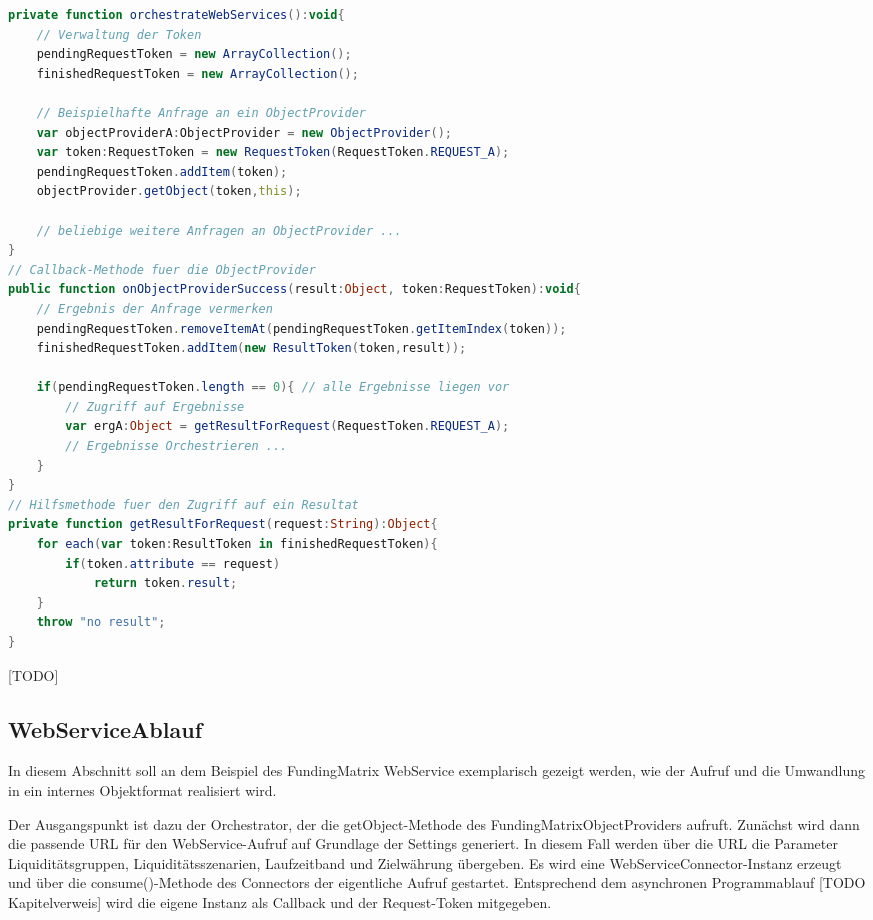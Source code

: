 \begin{programm}[h] %
\begin{lstlisting}[language=ActionScript]
private function orchestrateWebServices():void{
	// Verwaltung der Token
	pendingRequestToken = new ArrayCollection();
	finishedRequestToken = new ArrayCollection();
	
	// Beispielhafte Anfrage an ein ObjectProvider
	var objectProviderA:ObjectProvider = new ObjectProvider();
	var token:RequestToken = new RequestToken(RequestToken.REQUEST_A);
	pendingRequestToken.addItem(token);
	objectProvider.getObject(token,this);
	
	// beliebige weitere Anfragen an ObjectProvider ...
}
// Callback-Methode fuer die ObjectProvider
public function onObjectProviderSuccess(result:Object, token:RequestToken):void{
	// Ergebnis der Anfrage vermerken
	pendingRequestToken.removeItemAt(pendingRequestToken.getItemIndex(token));
	finishedRequestToken.addItem(new ResultToken(token,result));
	
	if(pendingRequestToken.length == 0){ // alle Ergebnisse liegen vor
		// Zugriff auf Ergebnisse
		var ergA:Object = getResultForRequest(RequestToken.REQUEST_A);
		// Ergebnisse Orchestrieren ...
	}
}
// Hilfsmethode fuer den Zugriff auf ein Resultat	
private function getResultForRequest(request:String):Object{
	for each(var token:ResultToken in finishedRequestToken){
		if(token.attribute == request)
			return token.result;
	}
	throw "no result";
}
\end{lstlisting}
\caption{[TODO]\label{[TODO]}}
\end{programm}

\subsection{WebServiceAblauf}
In diesem Abschnitt soll an dem Beispiel des FundingMatrix WebService exemplarisch gezeigt werden, wie der Aufruf und die Umwandlung in ein internes Objektformat realisiert wird.

Der Ausgangspunkt ist dazu der Orchestrator, der die getObject-Methode des FundingMatrixObjectProviders aufruft. Zunächst wird dann die passende URL für den WebService-Aufruf auf Grundlage der Settings generiert. In diesem Fall werden über die URL die Parameter Liquiditätsgruppen, Liquiditätsszenarien, Laufzeitband und Zielwährung übergeben. Es wird eine WebServiceConnector-Instanz erzeugt und über die consume()-Methode des Connectors der eigentliche Aufruf gestartet. Entsprechend dem asynchronen Programmablauf [TODO Kapitelverweis] wird die eigene Instanz als Callback und der Request-Token mitgegeben.

